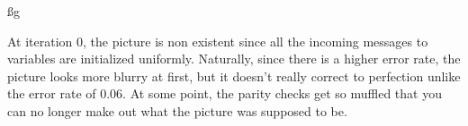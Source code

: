 \ss g

At iteration 0, the picture is non existent since all the incoming messages to variables are initialized uniformly. Naturally, since there is a higher error rate, the picture looks more blurry at first, but it doesn't really correct to perfection unlike the error rate of 0.06. At some point, the parity checks get so muffled that you can no longer make out what the picture was supposed to be.



